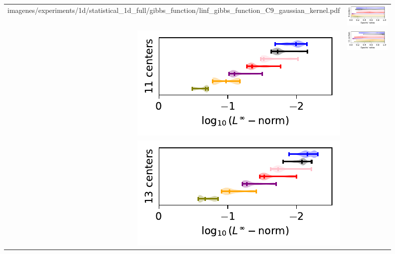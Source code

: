 \documentclass[12pt]{report} %
\begin{document}
\begin{figure}[H]
\begin{tabular}{rl}
{    {imagenes/experiments/1d/statistical_1d_full/gibbs_function/linf_gibbs_function_C9_gaussian_kernel.pdf}}  & 
    {\includegraphics[width=.44\textwidth, trim={.7cm 1.15cm 0 0},clip=true]
        {imagenes/experiments/1d/statistical_1d_full/gibbs_function/epochs_gibbs_function_C9_gaussian_kernel.pdf}}
    \\
    {\includegraphics[width=.5\textwidth, trim={0 1.25cm 0 0},clip=true]
    {imagenes/experiments/1d/statistical_1d_full/gibbs_function/linf_gibbs_function_C11_gaussian_kernel.pdf}} & 
    {\includegraphics[width=.44\textwidth, trim={.7cm 1.15cm 0 0},clip=true]
    {imagenes/experiments/1d/statistical_1d_full/gibbs_function/epochs_gibbs_function_C11_gaussian_kernel.pdf}}                                                                                     \\
    {\includegraphics[width=.5\textwidth, trim={0 1.25cm 0 0},clip=true]
    {imagenes/experiments/1d/statistical_1d_full/gibbs_function/linf_gibbs_function_C13_gaussian_kernel.pdf}} & 
    {\includegraphics[width=.44\textwidth, trim={.7cm 1.15cm 0 0},clip=true]
}
\end{tabular}
\end{figure}
\end{document}
